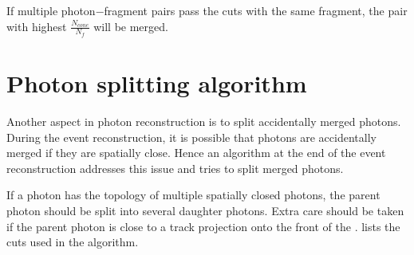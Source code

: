 \begin{table}[htbp]
\label{tab:photonHighEnergyFragCuts}
\end{table}


If multiple photon$-$fragment pairs pass the cuts with the same fragment, the pair with highest $\frac{N_{cone}}{N_f}$ will be merged.



\section{Photon splitting algorithm}
\label{sec:photonSplitting}


Another aspect in photon reconstruction is to split accidentally merged photons. During the event reconstruction, it is possible that photons are accidentally merged if they are spatially close. Hence an algorithm at the end of the event reconstruction addresses this issue and tries to split merged photons.

If a photon has the  topology of multiple spatially closed photons, the parent photon should be split into several daughter photons. Extra care should be taken if the parent photon is close to a track projection onto the front of the \ECAL.  lists the cuts used in the algorithm.

